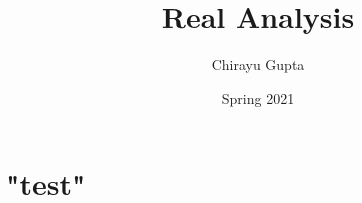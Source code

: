 \documentclass{article}
\title{Real Analysis}
\author{Chirayu Gupta}
\date{Spring 2021}
\begin{document}
\maketitle
\section{"test"}  
\end{document}
